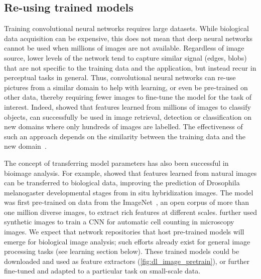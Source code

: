 \subsection{Re-using trained models}

Training convolutional neural networks requires large datasets. While biological data acquisition can be expensive, this does not mean that deep neural networks cannot be used when millions of images are not available. Regardless of image source, lower levels of the network tend to capture similar signal (edges, blobs) that are not specific to the training data and the application, but instead recur in perceptual tasks in general. Thus, convolutional neural networks can re-use pictures from a similar domain to help with learning, or even be pre-trained on other data, thereby requiring fewer images to fine-tune the model for the task of interest. Indeed, \citet{donahue_decaf:_2013} showed that features learned from millions of images to classify objects, can successfully be used in image retrieval, detection or classification on new domains where only hundreds of images are labelled. The effectiveness of such an approach depends on the similarity between the training data and the new domain~\citep{ghahramani_how_2014}.

The concept of transferring model parameters has also been successful in bioimage analysis. For example, \citet{zhang_deep_2015} showed that features learned from natural images can be transferred to biological data, improving the prediction of Drosophila melanogaster developmental stages from in situ hybridization images. The model was first pre-trained on data from the ImageNet~\citep{russakovsky_imagenet_2015}, an open corpus of more than one million diverse images, to extract rich features at different scales. \citet{xie_beyond_2015} further used synthetic images to train a CNN for automatic cell counting in microscopy images. We expect that network repositories that host pre-trained models will emerge for biological image analysis; such efforts already exist for general image processing tasks (see learning section below). These trained models could be downloaded and used as feature extractors (\autoref{fig:dl_image_pretrain}), or further fine-tuned and adapted to a particular task on small-scale data.

